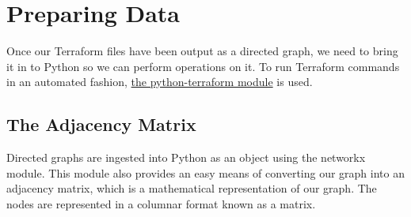 \section{\label{sec:preparation}Preparing Data}

\justifying
Once our Terraform files have been output as a directed graph, we need to bring it in to Python so we can
perform operations on it. To run Terraform commands in an automated fashion, \href{https://pypi.org/project/python-terraform/}{the python-terraform module}
is used.

\subsection{\label{sec:adjacency}The Adjacency Matrix}

\justifying
Directed graphs are ingested into Python as an object using the networkx module. This module also provides
an easy means of converting our graph into an adjacency matrix, which is a mathematical representation of
our graph. The nodes are represented in a columnar format known as a matrix.


\clearpage
\begin{versionhistory}
\end{versionhistory}
\nocite{*}




